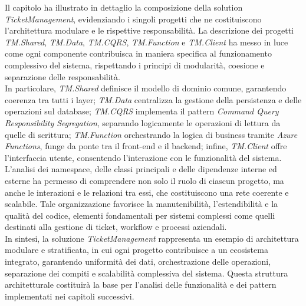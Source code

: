 Il capitolo ha illustrato in dettaglio la composizione della solution \textit{TicketManagement}, evidenziando i singoli progetti che ne costituiscono l'architettura modulare e le rispettive responsabilità. La descrizione dei progetti \textit{TM.Shared}, \textit{TM.Data}, \textit{TM.CQRS}, \textit{TM.Function} e \textit{TM.Client} ha messo in luce come ogni componente contribuisca in maniera specifica al funzionamento complessivo del sistema, rispettando i principi di modularità, coesione e separazione delle responsabilità.
\\
In particolare, \textit{TM.Shared} definisce il modello di dominio comune, garantendo coerenza tra tutti i layer; \textit{TM.Data} centralizza la gestione della persistenza e delle operazioni sul database; \textit{TM.CQRS} implementa il pattern \textit{Command Query Responsibility Segregation}, separando logicamente le operazioni di lettura da quelle di scrittura; \textit{TM.Function} orchestrando la logica di business tramite \textit{Azure Functions}, funge da ponte tra il front-end e il backend; infine, \textit{TM.Client} offre l'interfaccia utente, consentendo l'interazione con le funzionalità del sistema.
\\
L'analisi dei namespace, delle classi principali e delle dipendenze interne ed esterne ha permesso di comprendere non solo il ruolo di ciascun progetto, ma anche le interazioni e le relazioni tra essi, che costituiscono una rete coerente e scalabile. Tale organizzazione favorisce la manutenibilità, l'estendibilità e la qualità del codice, elementi fondamentali per sistemi complessi come quelli destinati alla gestione di ticket, workflow e processi aziendali.
\\
In sintesi, la soluzione \textit{TicketManagement} rappresenta un esempio di architettura modulare e stratificata, in cui ogni progetto contribuisce a un ecosistema integrato, garantendo uniformità dei dati, orchestrazione delle operazioni, separazione dei compiti e scalabilità complessiva del sistema. Questa struttura architetturale costituirà la base per l'analisi delle funzionalità e dei pattern implementati nei capitoli successivi.

